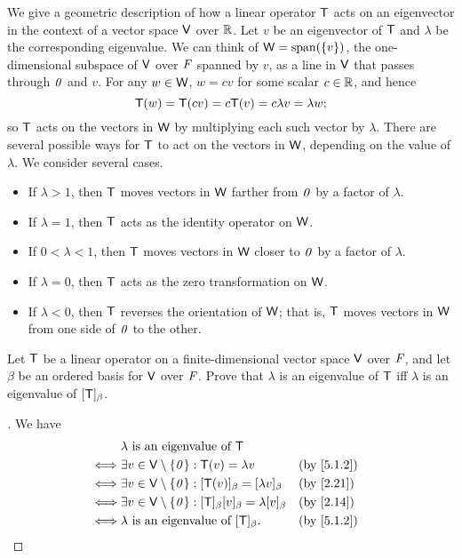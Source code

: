 \begin{note}
  We give a geometric description of how a linear operator \(\mathsf{T}\) acts on an eigenvector in the context of a vector space \(\mathsf{V}\) over \(\mathbb{R}\).
  Let \(v\) be an eigenvector of \(\mathsf{T}\) and \(\lambda\) be the corresponding eigenvalue.
  We can think of \(\W = \spn{\set{v}}\), the one-dimensional subspace of \(\mathsf{V}\) over \(\mathit{F}\) spanned by \(v\), as a line in \(\mathsf{V}\) that passes through \(\mathit{0}\) and \(v\).
  For any \(w \in \mathsf{W}\), \(w = cv\) for some scalar \(c \in \mathbb{R}\), and hence
  \[
    \mathsf{T}(w) = \mathsf{T}(cv) = c \mathsf{T}(v) = c \lambda v = \lambda w;
  \]
  so \(\mathsf{T}\) acts on the vectors in \(\mathsf{W}\) by multiplying each such vector by \(\lambda\).
  There are several possible ways for \(\mathsf{T}\) to act on the vectors in \(\mathsf{W}\), depending on the value of \(\lambda\).
  We consider several cases.
  \begin{itemize}
    \item If \(\lambda > 1\), then \(\mathsf{T}\) moves vectors in \(\mathsf{W}\) farther from \(\mathit{0}\) by a factor of \(\lambda\).
    \item If \(\lambda = 1\), then \(\mathsf{T}\) acts as the identity operator on \(\mathsf{W}\).
    \item If \(0 < \lambda < 1\), then \(\mathsf{T}\) moves vectors in \(\mathsf{W}\) closer to \(\mathit{0}\) by a factor of \(\lambda\).
    \item If \(\lambda = 0\), then \(\mathsf{T}\) acts as the zero transformation on \(\mathsf{W}\).
    \item If \(\lambda < 0\), then \(\mathsf{T}\) reverses the orientation of \(\mathsf{W}\);
          that is, \(\mathsf{T}\) moves vectors in \(\mathsf{W}\) from one side of \(\mathit{0}\) to the other.
  \end{itemize}
\end{note}

\exercisesection

\setcounter{ex}{5}
\begin{ex}\label{ex:5.1.6}
  Let \(\mathsf{T}\) be a linear operator on a finite-dimensional vector space \(\mathsf{V}\) over \(\mathit{F}\), and let \(\beta\) be an ordered basis for \(\mathsf{V}\) over \(\mathit{F}\).
  Prove that \(\lambda\) is an eigenvalue of \(\mathsf{T}\) iff \(\lambda\) is an eigenvalue of \([\mathsf{T}]_{\beta}\).
\end{ex}

\begin{proof}[]
  We have
  \begin{align*}
         & \lambda \text{ is an eigenvalue of } \T                                                               \\
    \iff & \exists v \in \V \setminus \set{\zv} : \T(v) = \lambda v                              &  & \by{5.1.2} \\
    \iff & \exists v \in \V \setminus \set{\zv} : [\T(v)]_{\beta} = [\lambda v]_{\beta}          &  & \by{2.21}  \\
    \iff & \exists v \in \V \setminus \set{\zv} : [\T]_{\beta} [v]_{\beta} = \lambda [v]_{\beta} &  & \by{2.14}  \\
    \iff & \lambda \text{ is an eigenvalue of } [\T]_{\beta}.                                    &  & \by{5.1.2}
  \end{align*}
\end{proof}

